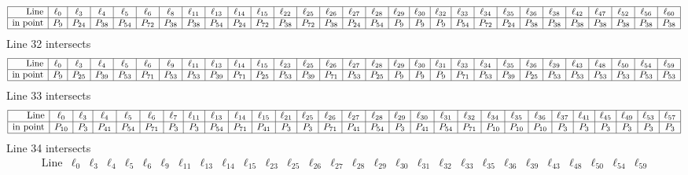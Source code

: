 \documentclass{article}
\begin{document}
{$$\begin{array}{|r*{28}{|c}|}
\hline
\mbox{Line}  & \ell_{0} & \ell_{3} & \ell_{4} & \ell_{5} & \ell_{6} & \ell_{8} & \ell_{11} & \ell_{13} & \ell_{14} & \ell_{15} & \ell_{22} & \ell_{25} & \ell_{26} & \ell_{27} & \ell_{28} & \ell_{29} & \ell_{30} & \ell_{32} & \ell_{33} & \ell_{34} & \ell_{35} & \ell_{36} & \ell_{38} & \ell_{42} & \ell_{47} & \ell_{52} & \ell_{56} & \ell_{60}\\
\hline
\mbox{in point}  & P_{9} & P_{24} & P_{38} & P_{54} & P_{72} & P_{38} & P_{38} & P_{54} & P_{24} & P_{72} & P_{38} & P_{72} & P_{38} & P_{24} & P_{54} & P_{9} & P_{9} & P_{9} & P_{54} & P_{72} & P_{24} & P_{38} & P_{38} & P_{38} & P_{38} & P_{38} & P_{38} & P_{38}\\
\hline
\end{array}
$$
Line 32 intersects 
$$
\begin{array}{|r*{28}{|c}|}
\hline
\mbox{Line}  & \ell_{0} & \ell_{3} & \ell_{4} & \ell_{5} & \ell_{6} & \ell_{9} & \ell_{11} & \ell_{13} & \ell_{14} & \ell_{15} & \ell_{23} & \ell_{25} & \ell_{26} & \ell_{27} & \ell_{28} & \ell_{29} & \ell_{30} & \ell_{31} & \ell_{33} & \ell_{34} & \ell_{35} & \ell_{36} & \ell_{39} & \ell_{43} & \ell_{48} & \ell_{50} & \ell_{54} & \ell_{59}\\
\hline
\mbox{in point}  & P_{9} & P_{25} & P_{39} & P_{53} & P_{71} & P_{53} & P_{53} & P_{39} & P_{71} & P_{25} & P_{53} & P_{39} & P_{71} & P_{53} & P_{25} & P_{9} & P_{9} & P_{9} & P_{71} & P_{53} & P_{39} & P_{25} & P_{53} & P_{53} & P_{53} & P_{53} & P_{53} & P_{53}\\
\hline
\end{array}
$$
Line 33 intersects 
$$
\begin{array}{|r*{28}{|c}|}
\hline
\mbox{Line}  & \ell_{0} & \ell_{3} & \ell_{4} & \ell_{5} & \ell_{6} & \ell_{7} & \ell_{11} & \ell_{13} & \ell_{14} & \ell_{15} & \ell_{21} & \ell_{25} & \ell_{26} & \ell_{27} & \ell_{28} & \ell_{29} & \ell_{30} & \ell_{31} & \ell_{32} & \ell_{34} & \ell_{35} & \ell_{36} & \ell_{37} & \ell_{41} & \ell_{45} & \ell_{49} & \ell_{53} & \ell_{57}\\
\hline
\mbox{in point}  & P_{10} & P_{3} & P_{41} & P_{54} & P_{71} & P_{3} & P_{3} & P_{54} & P_{71} & P_{41} & P_{3} & P_{3} & P_{71} & P_{41} & P_{54} & P_{3} & P_{41} & P_{54} & P_{71} & P_{10} & P_{10} & P_{10} & P_{3} & P_{3} & P_{3} & P_{3} & P_{3} & P_{3}\\
\hline
\end{array}
$$
Line 34 intersects 
$$
\begin{array}{|r*{28}{|c}|}
\hline
\mbox{Line}  & \ell_{0} & \ell_{3} & \ell_{4} & \ell_{5} & \ell_{6} & \ell_{9} & \ell_{11} & \ell_{13} & \ell_{14} & \ell_{15} & \ell_{23} & \ell_{25} & \ell_{26} & \ell_{27} & \ell_{28} & \ell_{29} & \ell_{30} & \ell_{31} & \ell_{32} & \ell_{33} & \ell_{35} & \ell_{36} & \ell_{39} & \ell_{43} & \ell_{48} & \ell_{50} & \ell_{54} & \ell_{59}\\

\end{array}$$}
\end{document}
